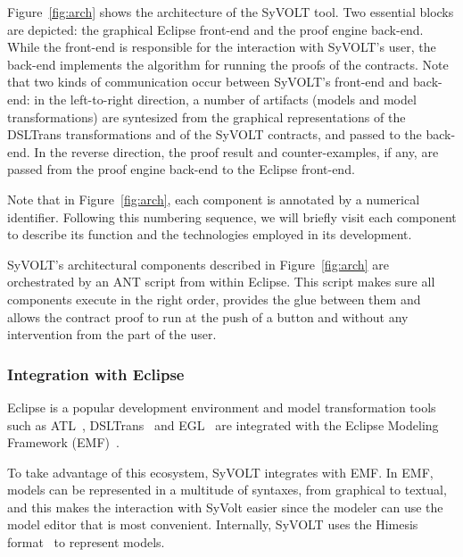  Figure~\ref{fig:arch} shows the
architecture of the SyVOLT tool. Two essential blocks are depicted: the
graphical Eclipse front-end and the proof engine back-end. While the front-end
is responsible for the interaction with SyVOLT's user, the back-end implements
the algorithm for running the proofs of the contracts. Note that two kinds of
communication occur between SyVOLT's front-end and back-end: in the
left-to-right direction, a number of artifacts (models and model
transformations) are syntesized from the graphical representations of the
DSLTrans transformations and of the SyVOLT contracts, and passed to the
back-end. In the reverse direction, the proof result and counter-examples, if
any, are passed from the proof engine back-end to the Eclipse front-end.

Note that in Figure~\ref{fig:arch}, each component is annotated by a numerical
identifier. Following this numbering sequence, we will briefly visit each
component to describe its function and the technologies employed in its development.

SyVOLT's architectural components described in Figure~\ref{fig:arch} are
orchestrated by an ANT script from within Eclipse. This script makes sure all
components execute in the right order, provides the glue between them and allows
the contract proof to run at the push of a button and without any intervention
from the part of the user.

\subsubsection{Integration with Eclipse}

 Eclipse is a popular development environment and model
transformation tools such as ATL~\cite{atlTool}, DSLTrans~\cite{Barroca2011} and
EGL~\cite{eglTool} are integrated with the Eclipse Modeling Framework
(EMF)~\cite{emfTool}.

To take advantage of this ecosystem, SyVOLT integrates with EMF.
In EMF, models can be represented in a multitude of syntaxes, from graphical
to textual, and this makes the interaction with SyVolt easier since the modeler
can use the model editor that is most convenient. Internally, SyVOLT uses 
the Himesis format~\cite{Provost2006} to represent models.


